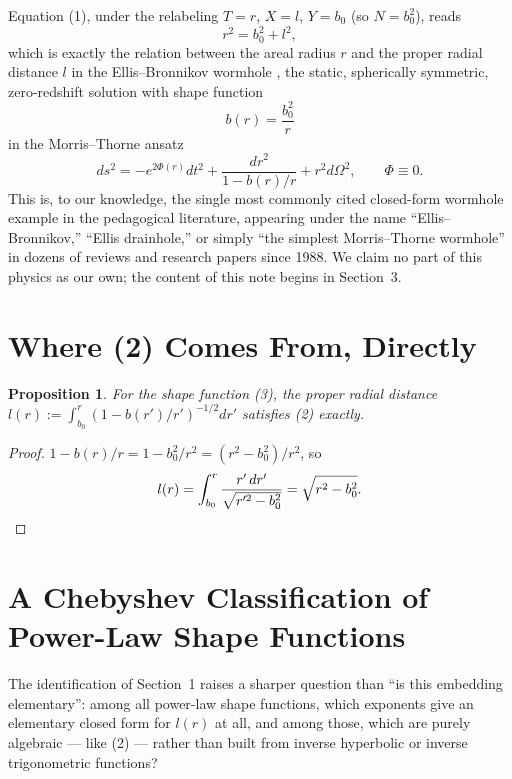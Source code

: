 \documentclass[12pt]{amsart}
\theoremstyle{plain}
\newtheorem{proposition}[theorem]{Proposition}
\theoremstyle{remark}
\begin{document}
Equation (1), under the relabeling $T=r$, $X=l$, $Y=b_0$ (so $N=b_0^2$), reads
\begin{equation}
r^2 = b_0^2 + l^2, \tag{2}
\end{equation}
which is exactly the relation between the areal radius $r$ and the proper radial distance $l$ in the Ellis--Bronnikov wormhole \cite{Ellis1973,Bronnikov1973}, the static, spherically symmetric, zero-redshift solution with shape function
\begin{equation}
b(r)=\frac{b_0^2}{r} \tag{3}
\end{equation}
in the Morris--Thorne ansatz \cite{MorrisThorne1988}
\begin{equation}
ds^2=-e^{2\Phi(r)}dt^2+\frac{dr^2}{1-b(r)/r}+r^2d\Omega^2, \qquad \Phi\equiv0. \tag{4}
\end{equation}
This is, to our knowledge, the single most commonly cited closed-form wormhole example in the pedagogical literature, appearing under the name ``Ellis--Bronnikov,'' ``Ellis drainhole,'' or simply ``the simplest Morris--Thorne wormhole'' in dozens of reviews and research papers since 1988. We claim no part of this physics as our own; the content of this note begins in Section~3.

\section{Where (2) Comes From, Directly}

\begin{proposition}\label{prop:embed}
For the shape function (3), the proper radial distance $l(r):=\int_{b_0}^r(1-b(r')/r')^{-1/2}dr'$ satisfies (2) exactly.
\end{proposition}

\begin{proof}
$1-b(r)/r=1-b_0^2/r^2=(r^2-b_0^2)/r^2$, so
\[
l(r)=\int_{b_0}^r\frac{r'\,dr'}{\sqrt{r'^2-b_0^2}}=\sqrt{r^2-b_0^2}. \qedhere
\]
\end{proof}

\section{A Chebyshev Classification of Power-Law Shape Functions}

The identification of Section~1 raises a sharper question than ``is this embedding elementary'': among all power-law shape functions, which exponents give an elementary closed form for $l(r)$ at all, and among those, which are purely algebraic --- like (2) --- rather than built from inverse hyperbolic or inverse trigonometric functions?
\end{document}
